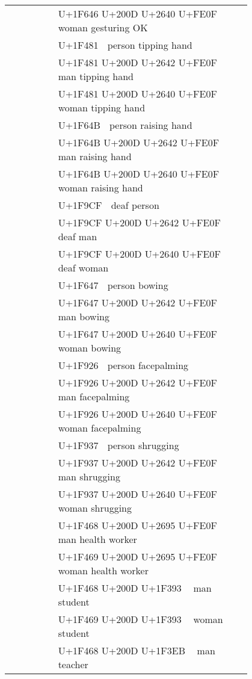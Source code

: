 \documentclass[a4paper,12pt]{ltjarticle}
\newcommand{\fontA}[1]{{\fontspec[RawFeature={mode=harf,dist,ccmp}]{Segoe UI Emoji} #1}}
\newcommand{\fontB}[1]{{\fontspec[RawFeature={mode=harf,dist,ccmp}]{Noto Color Emoji} #1}}
\begin{document}
\begin{longtable}[c]{ccp{0.8\linewidth}}
\fontA{🙆‍♀️}&\fontB{🙆‍♀️}&U+1F646 U+200D U+2640 U+FE0F 🙆‍♀️ woman gesturing OK\\
\fontA{💁}&\fontB{💁}&U+1F481 💁 person tipping hand\\
\fontA{💁‍♂️}&\fontB{💁‍♂️}&U+1F481 U+200D U+2642 U+FE0F 💁‍♂️ man tipping hand\\
\fontA{💁‍♀️}&\fontB{💁‍♀️}&U+1F481 U+200D U+2640 U+FE0F 💁‍♀️ woman tipping hand\\
\fontA{🙋}&\fontB{🙋}&U+1F64B 🙋 person raising hand\\
\fontA{🙋‍♂️}&\fontB{🙋‍♂️}&U+1F64B U+200D U+2642 U+FE0F 🙋‍♂️ man raising hand\\
\fontA{🙋‍♀️}&\fontB{🙋‍♀️}&U+1F64B U+200D U+2640 U+FE0F 🙋‍♀️ woman raising hand\\
\fontA{🧏}&\fontB{🧏}&U+1F9CF 🧏 deaf person\\
\fontA{🧏‍♂️}&\fontB{🧏‍♂️}&U+1F9CF U+200D U+2642 U+FE0F 🧏‍♂️ deaf man\\
\fontA{🧏‍♀️}&\fontB{🧏‍♀️}&U+1F9CF U+200D U+2640 U+FE0F 🧏‍♀️ deaf woman\\
\fontA{🙇}&\fontB{🙇}&U+1F647 🙇 person bowing\\
\fontA{🙇‍♂️}&\fontB{🙇‍♂️}&U+1F647 U+200D U+2642 U+FE0F 🙇‍♂️ man bowing\\
\fontA{🙇‍♀️}&\fontB{🙇‍♀️}&U+1F647 U+200D U+2640 U+FE0F 🙇‍♀️ woman bowing\\
\fontA{🤦}&\fontB{🤦}&U+1F926 🤦 person facepalming\\
\fontA{🤦‍♂️}&\fontB{🤦‍♂️}&U+1F926 U+200D U+2642 U+FE0F 🤦‍♂️ man facepalming\\
\fontA{🤦‍♀️}&\fontB{🤦‍♀️}&U+1F926 U+200D U+2640 U+FE0F 🤦‍♀️ woman facepalming\\
\fontA{🤷}&\fontB{🤷}&U+1F937 🤷 person shrugging\\
\fontA{🤷‍♂️}&\fontB{🤷‍♂️}&U+1F937 U+200D U+2642 U+FE0F 🤷‍♂️ man shrugging\\
\fontA{🤷‍♀️}&\fontB{🤷‍♀️}&U+1F937 U+200D U+2640 U+FE0F 🤷‍♀️ woman shrugging\\
\fontA{👨‍⚕️}&\fontB{👨‍⚕️}&U+1F468 U+200D U+2695 U+FE0F 👨‍⚕️ man health worker\\
\fontA{👩‍⚕️}&\fontB{👩‍⚕️}&U+1F469 U+200D U+2695 U+FE0F 👩‍⚕️ woman health worker\\
\fontA{👨‍🎓}&\fontB{👨‍🎓}&U+1F468 U+200D U+1F393 👨‍🎓 man student\\
\fontA{👩‍🎓}&\fontB{👩‍🎓}&U+1F469 U+200D U+1F393 👩‍🎓 woman student\\
\fontA{👨‍🏫}&\fontB{👨‍🏫}&U+1F468 U+200D U+1F3EB 👨‍🏫 man teacher\\

\end{longtable}
\end{document}
